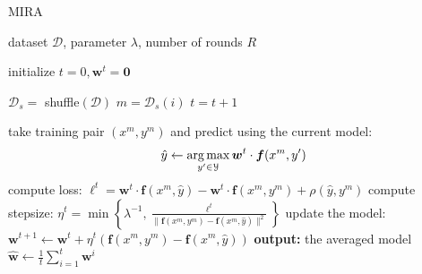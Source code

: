 \begin{algorithm}[t]

   \caption{MIRA \label{alg:mira}}

\begin{algorithmic}[1]
    dataset $\mathcal{D}$, parameter $\lambda$, number of rounds $R$

   \STATE initialize $t = 0, \boldsymbol{w}^t = \mathbf{0}$

         \STATE $\mathcal{D}_s =$ shuffle$(\mathcal{D})$
        \STATE $m = \mathcal{D}_s(i)$
        \STATE $t = t+1$

	\STATE take training pair $(x^m, y^m)$ and predict using the current model: 
	$$\hat{y}  \leftarrow \operatorname*{arg\,max}_{y'\in\mathcal{Y}} \boldsymbol{w}^t \cdot \boldsymbol{f}(x^m,y')$$
	\STATE compute loss: $\ell^t = \boldsymbol{w}^t \cdot \boldsymbol{f}(x^m,\hat{y}) - \boldsymbol{w}^t \cdot \boldsymbol{f}(x^m,y^m) + \rho(\hat{y},y^m)$
	\STATE compute stepsize: $\eta^t = \min\left\{\lambda^{-1}, \frac{\ell^t}{\|\boldsymbol{f}(x^m,y^m) - \boldsymbol{f}(x^m,\hat{y})\|^2}\right\}$
	\STATE update the model: 
	$\boldsymbol{w}^{t+1} \leftarrow  \boldsymbol{w}^{t} + \eta^t  (\boldsymbol{f}(x^m,y^m) - \boldsymbol{f}(x^m,\hat{y}))$
	\ENDFOR
	\ENDFOR
   \STATE \textbf{output:} the averaged model $\hat{\boldsymbol{w}} \leftarrow \frac{1}{t}\sum_{i=1}^{t} \boldsymbol{w}^i$

\end{algorithmic}
%
%
%
%
%

\end{algorithm}



